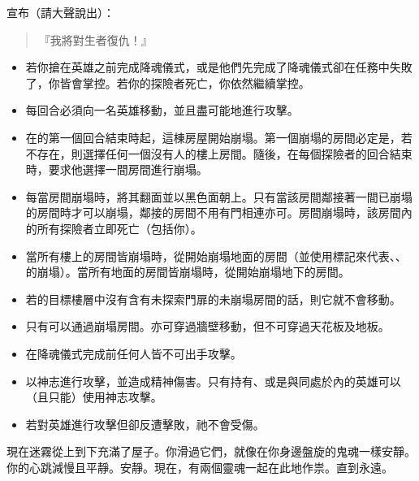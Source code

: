 宣布（請大聲說出）：
\begin{quote}
  『我將對生者復仇！』
\end{quote}

\vfill\null\pagebreak

\begin{itemize}
  \item 若你搶在英雄之前完成降魂儀式，或是他們先完成了降魂儀式卻在任務中失敗了，你皆會掌控。若你的探險者死亡，你依然繼續掌控。
  \item {}每回合必須向一名英雄移動，並且盡可能地進行攻擊。
  \item 在的第一個回合結束時起，這棟房屋開始崩塌。第一個崩塌的房間必定是，若不存在，則選擇任何一個沒有人的樓上房間。隨後，在每個探險者的回合結束時，要求他選擇一間房間進行崩塌。
  \item 每當房間崩塌時，將其翻面並以黑色面朝上。只有當該房間鄰接著一間已崩塌的房間時才可以崩塌，鄰接的房間不用有門相連亦可。房間崩塌時，該房間內的所有探險者立即死亡（包括你）。
  \item 當所有樓上的房間皆崩塌時，從開始崩塌地面的房間（並使用標記來代表、、的崩塌）。當所有地面的房間皆崩塌時，從開始崩塌地下的房間。
  \item 若的目標樓層中沒有含有未探索門扉的未崩塌房間的話，則它就不會移動。
  \item 只有可以通過崩塌房間。亦可穿過牆壁移動，但不可穿過天花板及地板。
\end{itemize}

\vspace*{-1em}
\begin{itemize}
  \item 在降魂儀式完成前任何人皆不可出手攻擊。\iffalse{如果英雄控制\Monster*{Ghost}，他們會告知你特殊攻擊規則。}\fi
  \item {}以神志進行攻擊，並造成精神傷害。只有持有、或是與同處於內的英雄可以（且只能）使用神志攻擊。
  \item 若對英雄進行攻擊但卻反遭擊敗，祂不會受傷。
\end{itemize}

\begin{HauntStory}
  現在迷霧從上到下充滿了屋子。你滑過它們，就像在你身邊盤旋的鬼魂一樣安靜。你的心跳減慢且平靜。安靜。現在，有兩個靈魂一起在此地作祟。直到永遠。
\end{HauntStory}
